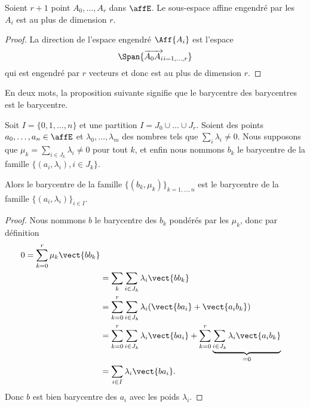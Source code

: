 \begin{proposition}
    Soient \( r+1\) point \( A_0,\ldots, A_r\) dans \( \affE\). Le sous-espace affine engendré par les \( A_i\) est au plus de dimension \( r\).
\end{proposition}

\begin{proof}
    La direction de l'espace engendré \( \Aff\{ A_i \}\) est l'espace
    \begin{equation}
        \Span\{ \overrightarrow{ A_0A_i }_{i=1,\ldots, r} \}
    \end{equation}
    qui est engendré par \( r\) vecteurs et donc est au plus de dimension \( r\).
\end{proof}

En deux mots, la proposition suivante signifie que le barycentre des barycentres est le barycentre.
\begin{proposition}        \label{PropSFvjFZb}
    Soit \( I=\{ 0,1,\ldots, n \}\) et une partition \( I=J_0\cup\ldots\cup J_r\). Soient des points \( a_0,\ldots, a_n\in \affE\) et \( \lambda_0,\ldots, \lambda_m\) des nombres tels que \( \sum_i\lambda_i\neq 0\). Nous supposons que \( \mu_k=\sum_{i\in J_k}\lambda_i\neq 0\) pour tout \( k\), et enfin nous nommons \( b_k\) le barycentre de la famille \( \{ (a_i,\lambda_i),i\in J_k \}\).

    Alors le barycentre de la famille \( \{ (b_k,\mu_k) \}_{k=1,\ldots, n}\) est le barycentre de la famille \( \{ (a_i,\lambda_i) \}_{i\in I}\).
\end{proposition}

\begin{proof}
    Nous nommons \( b\) le barycentre des \( b_k\) pondérés par les \( \mu_k\), donc par définition
    \begin{subequations}
        \begin{align}
            0=\sum_{k=0}^r\mu_k\vect{ bb_k }\\
            &=\sum_{k}\sum_{i\in J_k}\lambda_i\vect{ bb_k }\\
            &=\sum_{k=0}^r\sum_{i\in J_k}\lambda_i(\vect{ ba_i }+\vect{ a_ib_k })\\
            &=\sum_{k=0}^r\sum_{i\in J_k}\lambda_i\vect{ ba_i }  +\sum_{k=0}^r\underbrace{\sum_{i\in J_k}\lambda_i\vect{ a_ib_k }}_{=0}\\
            &=\sum_{i\in I}\lambda_i\vect{ ba_i }.
        \end{align}
    \end{subequations}
    Donc \( b\) est bien barycentre des \( a_i\) avec les poids \( \lambda_i\).
\end{proof}

